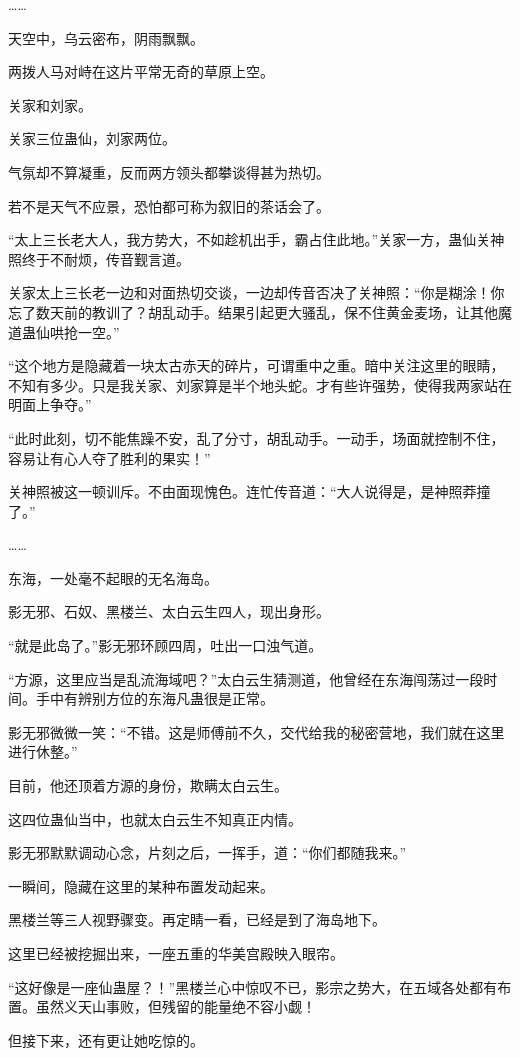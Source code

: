 \begin{this_body}
……

天空中，乌云密布，阴雨飘飘。

两拨人马对峙在这片平常无奇的草原上空。

关家和刘家。

关家三位蛊仙，刘家两位。

气氛却不算凝重，反而两方领头都攀谈得甚为热切。

若不是天气不应景，恐怕都可称为叙旧的茶话会了。

“太上三长老大人，我方势大，不如趁机出手，霸占住此地。”关家一方，蛊仙关神照终于不耐烦，传音觐言道。

关家太上三长老一边和对面热切交谈，一边却传音否决了关神照：“你是糊涂！你忘了数天前的教训了？胡乱动手。结果引起更大骚乱，保不住黄金麦场，让其他魔道蛊仙哄抢一空。”

“这个地方是隐藏着一块太古赤天的碎片，可谓重中之重。暗中关注这里的眼睛，不知有多少。只是我关家、刘家算是半个地头蛇。才有些许强势，使得我两家站在明面上争夺。”

“此时此刻，切不能焦躁不安，乱了分寸，胡乱动手。一动手，场面就控制不住，容易让有心人夺了胜利的果实！”

关神照被这一顿训斥。不由面现愧色。连忙传音道：“大人说得是，是神照莽撞了。”

……

东海，一处毫不起眼的无名海岛。

影无邪、石奴、黑楼兰、太白云生四人，现出身形。

“就是此岛了。”影无邪环顾四周，吐出一口浊气道。

“方源，这里应当是乱流海域吧？”太白云生猜测道，他曾经在东海闯荡过一段时间。手中有辨别方位的东海凡蛊很是正常。

影无邪微微一笑：“不错。这是师傅前不久，交代给我的秘密营地，我们就在这里进行休整。”

目前，他还顶着方源的身份，欺瞒太白云生。

这四位蛊仙当中，也就太白云生不知真正内情。

影无邪默默调动心念，片刻之后，一挥手，道：“你们都随我来。”

一瞬间，隐藏在这里的某种布置发动起来。

黑楼兰等三人视野骤变。再定睛一看，已经是到了海岛地下。

这里已经被挖掘出来，一座五重的华美宫殿映入眼帘。

“这好像是一座仙蛊屋？！”黑楼兰心中惊叹不已，影宗之势大，在五域各处都有布置。虽然义天山事败，但残留的能量绝不容小觑！

但接下来，还有更让她吃惊的。


\end{this_body}
